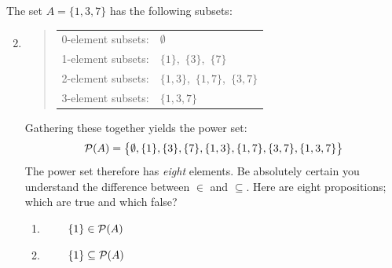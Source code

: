 \begin{examples}{}{}
	\exstart The set $A=\{1,3,7\}$ has the following subsets:
	\begin{enumerate}\setcounter{enumi}{1}
		\item[]
		\begin{quote}
			\begin{tabular}{@{}ll}
				0-element subsets:&$\emptyset$\\
				1-element subsets:&$\{1\}$,\ $\{3\}$,\ $\{7\}$\\
				2-element subsets:&$\{1,3\}$,\ $\{1,7\}$,\ $\{3,7\}$\\
				3-element subsets:&$\{1,3,7\}$
			\end{tabular}
		\end{quote}
		Gathering these together yields the power set:
		\[
			\mathcal{P}(A)=\bigl\{\emptyset, \{1\},\{3\},\{7\}, \{1,3\},\{1,7\},\{3,7\}, \{1,3,7\}\bigr\}
		\]
		The power set therefore has \emph{eight} elements. Be absolutely certain you understand the difference between $\in$ and $\subseteq$. Here are eight propositions; which are true and which false?\footnotemark
		\begin{enumerate}
			\item {} \  \  \ $\{1\}\in\mathcal{P}(A)$
			\setcounter{enumii}{4}
			\item {} \  \  \ $\{1\}\subseteq\mathcal{P}(A)$
		\end{enumerate}
	

\end{enumerate}
\end{examples}

